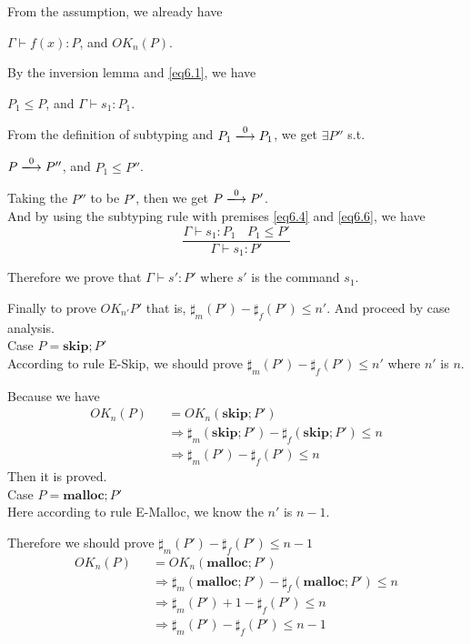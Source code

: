 \documentclass[english]{jssst_ppl} %
\newcommand\SKIP{\mathbf{skip}}
\newcommand\Malloc{\mathbf{malloc}}
\theoremstyle{definition}
\begin{document}
From the assumption, we already have
\begin{center}
$\Gamma \vdash f(x) : P$, and $OK_{n}(P)$.
\end{center}

By the inversion lemma and \eqref{eq6.1}, we have
\begin{center}
$P_{1} \le P$, and $\Gamma \vdash s_{1} : P_{1}$.
\end{center}

From the definition of subtyping and $P_{1} \xlongrightarrow{0} P_{1}$, we get $\exists P''$ s.t.
\begin{center}
$P \xlongrightarrow{0} P''$, and $P_{1} \le P''$.
\end{center}

Taking the $P''$ to be $P'$, then we get $P \xlongrightarrow{0} P'$.\\
And by using the subtyping rule with premises \eqref{eq6.4} and  \eqref{eq6.6}, we have
$$
\frac{\Gamma \vdash s_{1} : P_{1} \ \ \ \ P_{1} \le P'}{\Gamma \vdash s_{1} : P'}
$$

Therefore we prove that $\Gamma \vdash s' : P'$ where $s'$ is the command $s_{1}$.

\noindent Finally to prove $OK_{n'}P'$ that is, $\sharp_{m}(P')-\sharp_{f}(P') \le n'$. And  proceed by case analysis.\\

\noindent Case $P =  \SKIP;P'$\\

According to rule E-Skip, we should prove  $\sharp_{m}(P')-\sharp_{f}(P') \le n'$ where $n'$ is $n$.

Because we have
\begin{eqnarray*}
  OK_{n}(P)  & & =  OK_{n}(\SKIP;P')\\
  & & \Rightarrow \sharp_{m}(\SKIP;P') - \sharp_{f}(\SKIP;P') \le n \\
  & & \Rightarrow \sharp_{m}(P') - \sharp_{f}(P') \le n \
\end{eqnarray*}
Then it is proved. \\

\noindent Case $P = \Malloc;P'$ \\

Here according to rule E-Malloc, we know the $n'$ is $n-1$.

Therefore we should prove $\sharp_{m}(P') - \sharp_{f}(P') \le n-1$
\begin{eqnarray*}
  OK_{n}(P)&& =  OK_{n}(\Malloc;P')\\
  &&\Rightarrow \sharp_{m}(\Malloc;P') - \sharp_{f}(\Malloc;P') \le n \\
  &&\Rightarrow  \sharp_{m}(P') + 1 - \sharp_{f}(P') \le n\\
  &&\Rightarrow  \sharp_{m}(P')  - \sharp_{f}(P') \le n-1\\
\end{eqnarray*}
\end{document}
